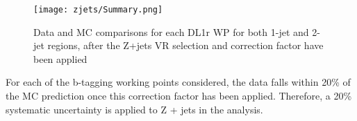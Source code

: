                                                                                                                              
\begin{figure}[H]                                                                                                        
   \centering
   \texttt{[image: zjets/Summary.png]}
   \caption{Data and MC comparisons for each DL1r WP for both 1-jet and 2-jet regions, after the Z+jets VR selection and correction factor have been applied}                                                                                             
   \label{fig:ttbar_summary}
\end{figure}

For each of the b-tagging working points considered, the data falls within 20\% of the MC prediction once this correction factor has been applied. Therefore, a 20\% systematic uncertainty is applied to Z + jets in the analysis.
